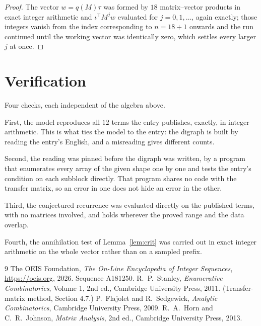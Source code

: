 \documentclass[11pt,a4paper]{article}
\theoremstyle{plain}
\theoremstyle{definition}
\begin{document}
\begin{proof}
The vector $w=q(M)\tau$ was formed by $18$ matrix--vector products in exact integer
arithmetic and $\iota^{\!\top}M^{j}w$ evaluated for $j=0,1,\dots$, again exactly; those
integers vanish from the index corresponding to $n=18+1$ onwards and the run continued
until the working vector was identically zero, which settles every larger $j$ at once.
\end{proof}

\section{Verification}

Four checks, each independent of the algebra above.

First, the model reproduces all $12$ terms the entry publishes, exactly, in integer
arithmetic. This is what ties the model to the entry: the digraph is built by reading the
entry's English, and a misreading gives different counts.

Second, the reading was pinned before the digraph was written, by a program that enumerates
every array of the given shape one by one and tests the entry's condition on each subblock
directly. That program shares no code with the transfer matrix, so an error in one does not
hide an error in the other.

Third, the conjectured recurrence was evaluated directly on the published terms, with no
matrices involved, and holds wherever the proved range and the data overlap.

Fourth, the annihilation test of Lemma~\ref{lem:crit} was carried out in exact integer
arithmetic on the whole vector rather than on a sampled prefix.

\begin{thebibliography}{9}
 The OEIS Foundation, \emph{The On-Line Encyclopedia of Integer
Sequences}, \url{https://oeis.org}, 2026. Sequence A181250.
 R.~P.~Stanley, \emph{Enumerative Combinatorics}, Volume 1, 2nd ed.,
Cambridge University Press, 2011. (Transfer-matrix method, Section 4.7.)
 P.~Flajolet and R.~Sedgewick, \emph{Analytic Combinatorics}, Cambridge
University Press, 2009.
 R.~A.~Horn and C.~R.~Johnson, \emph{Matrix Analysis}, 2nd ed., Cambridge
University Press, 2013.
\end{thebibliography}
\end{document}
